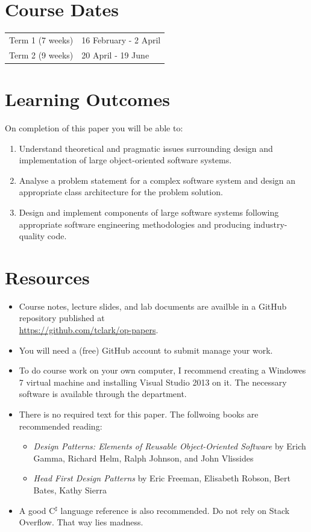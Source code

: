 \documentclass{article}
\newcommand{\Csh}{C$^\sharp$}
\begin{document}
\section*{Course Dates}
\begin{tabular}{ll}
Term 1 (7 weeks) & 16 February - 2 April\\
Term 2 (9 weeks) & 20 April - 19 June\\
\end{tabular}

\section*{Learning Outcomes}
On completion of this paper you will be able to:
\begin{enumerate}
    \item Understand theoretical and pragmatic issues surrounding design and implementation of large object-oriented software systems.
    \item Analyse a problem statement for a complex software system and design an appropriate class architecture for the problem solution.
    \item Design and implement components of large software systems following appropriate software engineering methodologies and producing industry-quality code.
\end{enumerate}

\section*{Resources}
\begin{itemize}
	\item Course notes, lecture slides, and lab documents are availble in a GitHub repository published at \\ \url{https://github.com/tclark/op-papers}.
	\item You will need a (free) GitHub account to submit manage your work.
	\item To do course work on your own computer, I recommend creating a Windowes 7 virtual machine and installing Visual Studio 2013 on it.  The necessary software is available through the department.
	\item There is no required text for this paper.  The follwoing books are recommended reading:
		\begin{itemize}
			\item \emph{Design Patterns: Elements of Reusable Object-Oriented Software} by Erich Gamma, Richard Helm, Ralph Johnson, and John Vlissides
			\item \emph{Head First Design Patterns} by Eric Freeman, Elisabeth Robson, Bert Bates, Kathy Sierra
		\end{itemize}
	\item A good \Csh{} language reference is also recommended. Do not rely on Stack Overflow.  That way lies madness.
\end{itemize}
\end{document}
